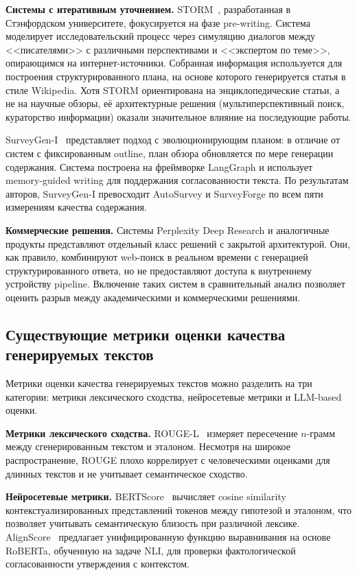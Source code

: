 \documentclass[a4paper,14pt]{extarticle}
\begin{document}
\textbf{Системы с итеративным уточнением.} STORM~\cite{shao2024storm}, разработанная в Стэнфордском университете, фокусируется на фазе pre-writing. Система моделирует исследовательский процесс через симуляцию диалогов между <<писателями>> с различными перспективами и <<экспертом по теме>>, опирающимся на интернет-источники. Собранная информация используется для построения структурированного плана, на основе которого генерируется статья в стиле Wikipedia. Хотя STORM ориентирована на энциклопедические статьи, а не на научные обзоры, её архитектурные решения (мультиперспективный поиск, кураторство информации) оказали значительное влияние на последующие работы.

SurveyGen-I~\cite{surveygen_i2025} представляет подход с эволюционирующим планом: в отличие от систем с фиксированным outline, план обзора обновляется по мере генерации содержания. Система построена на фреймворке LangGraph и использует memory-guided writing для поддержания согласованности текста. По результатам авторов, SurveyGen-I превосходит AutoSurvey и SurveyForge по всем пяти измерениям качества содержания.

\textbf{Коммерческие решения.} Системы Perplexity Deep Research и аналогичные продукты представляют отдельный класс решений с закрытой архитектурой. Они, как правило, комбинируют web-поиск в реальном времени с генерацией структурированного ответа, но не предоставляют доступа к внутреннему устройству pipeline. Включение таких систем в сравнительный анализ позволяет оценить разрыв между академическими и коммерческими решениями.


\subsection{Существующие метрики оценки качества генерируемых текстов}

Метрики оценки качества генерируемых текстов можно разделить на три категории: метрики лексического сходства, нейросетевые метрики и LLM-based оценки.

\textbf{Метрики лексического сходства.} ROUGE-L~\cite{lin2004rouge} измеряет пересечение $n$-грамм между сгенерированным текстом и эталоном. Несмотря на широкое распространение, ROUGE плохо коррелирует с человеческими оценками для длинных текстов и не учитывает семантическое сходство.

\textbf{Нейросетевые метрики.} BERTScore~\cite{zhang2020bertscore} вычисляет cosine similarity контекстуализированных представлений токенов между гипотезой и эталоном, что позволяет учитывать семантическую близость при различной лексике. AlignScore~\cite{zha2023alignscore} предлагает унифицированную функцию выравнивания на основе RoBERTa, обученную на задаче NLI, для проверки фактологической согласованности утверждения с контекстом.
\end{document}
